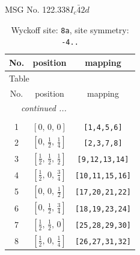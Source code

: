 \documentclass[fleqn,8pt]{jsarticle}
\begin{document}
\setcounter{MaxMatrixCols}{32}

\renewcommand{\tablename}{Table~}
\renewcommand{\figurename}{Figure~}
\begin{center}
\LARGE
MSG No. 122.338\quad$I_{c}\bar{4}2d$
\end{center}
\renewcommand{\arraystretch}{1.2}
\begin{longtable}{ccc}
\caption{Wyckoff site: {\tt 8a}, site symmetry: {\tt -4..}}
 \\
 \hline \hline
No. & position & mapping \\ \hline \endfirsthead

\multicolumn{2}{l}{\tablename\ \thetable{}} \\
 \hline \hline
No. & position & mapping \\ \hline \endhead

 \hline \hline
\multicolumn{2}{r}{\footnotesize\it continued ...} \\ \endfoot

 \hline \hline
\multicolumn{2}{r}{} \\ \endlastfoot

1 & $\left[ 0,\, 0,\, 0 \right]$ & {\tt [1,4,5,6]} \\ \hline
2 & $\left[ 0,\, \frac{1}{2},\, \frac{1}{4} \right]$ & {\tt [2,3,7,8]} \\ \hline
3 & $\left[ \frac{1}{2},\, \frac{1}{2},\, \frac{1}{2} \right]$ & {\tt [9,12,13,14]} \\ \hline
4 & $\left[ \frac{1}{2},\, 0,\, \frac{3}{4} \right]$ & {\tt [10,11,15,16]} \\ \hline
5 & $\left[ 0,\, 0,\, \frac{1}{2} \right]$ & {\tt [17,20,21,22]} \\ \hline
6 & $\left[ 0,\, \frac{1}{2},\, \frac{3}{4} \right]$ & {\tt [18,19,23,24]} \\ \hline
7 & $\left[ \frac{1}{2},\, \frac{1}{2},\, 0 \right]$ & {\tt [25,28,29,30]} \\ \hline
8 & $\left[ \frac{1}{2},\, 0,\, \frac{1}{4} \right]$ & {\tt [26,27,31,32]} \\
\end{longtable}
\renewcommand{\arraystretch}{1.2}
\end{document}
